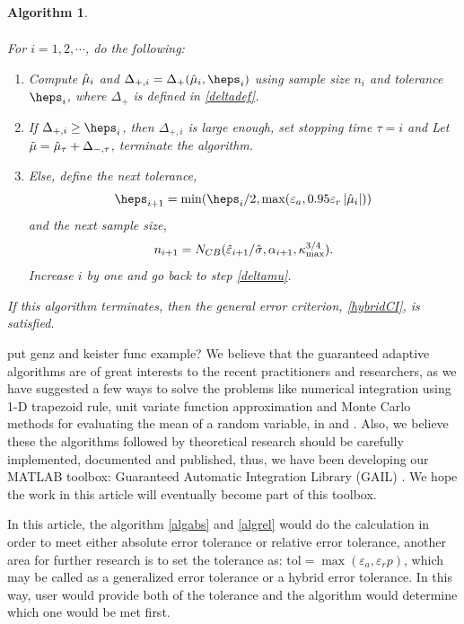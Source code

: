 \documentclass{iitthesis}
\newtheorem{algorithm}[theorem]{Algorithm}
\begin{document}
\begin{algorithm}
\begin{enumerate}
\begin{align}
\end{align}
For $i = 1,2,\cdots$, do the following:
\begin{enumerate}
\item  \label{deltamu}Compute $\hat{\mu}_i$ and $\Delta_{+,i}=\Delta_{+}(\hmu_i,\heps_i)$ using sample size $n_i$ and tolerance $\heps_i$, where $\Delta_{+}$ is defined in \eqref{deltadef}.
\item If $\Delta_{+,i} \geq  \heps_i$, then $\Delta_{+,i}$ is large enough, set stopping time $\tau = i$ and Let $\tilde{\mu} = \hat{\mu}_{\tau}+\Delta_{-, \tau}$, terminate the algorithm.
\item Else, define the next tolerance, $$\heps_{i+1} = \min(\heps_i/2, \max(\varepsilon_a,0.95\varepsilon_r\abs{\hmu_i}))$$ and the next sample size, $$n_{i+1} = N_{CB}(\hat{\varepsilon}_{i+1}/\hat{\sigma},\alpha_{i+1},\kappa_{\max}^{3/4}).$$ Increase $i$ by one and go back to step \ref{deltamu}. 
\end{enumerate}
\end{enumerate}
If this algorithm terminates, then the general error criterion, \eqref{hybridCI}, is satisfied.
\end{algorithm}

put genz and keister func example?
\label{chapter:comclusion}
\label{chapter: future work}
We believe that the guaranteed adaptive algorithms are of great interests to the recent practitioners and researchers, as we have suggested a few ways to solve the problems like numerical integration using 1-D trapezoid rule, unit variate function approximation and Monte Carlo methods for evaluating the mean of a random variable,  in \cite{CDHHZ13} and \cite{HJLO12}. Also, we believe these the algorithms followed by theoretical research should be carefully implemented, documented and published, thus, we have been developing our MATLAB toolbox: Guaranteed Automatic Integration Library (GAIL) \cite{GAIL_1_3}. We hope the work in this article will eventually become part of this toolbox.

In this article, the algorithm \ref{algabs} and \ref{algrel} would do the calculation in order to meet either absolute error tolerance or relative error tolerance, another area for further research is to set the tolerance as: $\text{tol} = \max(\varepsilon_a, \varepsilon_r p)$, which may be called as a generalized error tolerance or a hybrid error tolerance. In this way, user would provide both of the tolerance and the algorithm would determine which one would be met first.
\end{document}
